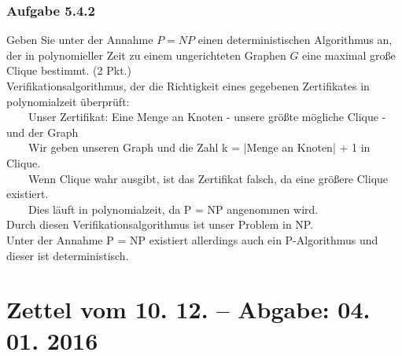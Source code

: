 \documentclass{article}
\begin{document}
\subsubsection*{Aufgabe 5.4.2}
\label{sssec:5.4.2}
Geben Sie unter der Annahme $P = NP$ einen deterministischen Algorithmus an, der in polynomieller
Zeit zu einem ungerichteten Graphen $G$ eine maximal große Clique bestimmt. (2 Pkt.)
\vspace{1cm}\-\\
Verifikationsalgorithmus, der die Richtigkeit eines gegebenen Zertifikates in polynomialzeit überprüft:\\
\-~~~~Unser Zertifikat: Eine Menge an Knoten - unsere größte mögliche Clique - und der Graph\\
\-~~~~Wir geben unseren Graph und die Zahl k = |Menge an Knoten| + 1 in Clique.\\
\-~~~~Wenn Clique wahr ausgibt, ist das Zertifikat falsch, da eine größere Clique existiert.\\
\-~~~~Dies läuft in polynomialzeit, da P = NP angenommen wird.\\
Durch diesen Verifikationsalgorithmus ist unser Problem in NP.\\
Unter der Annahme P = NP existiert allerdings auch ein P-Algorithmus und dieser ist deterministisch.

\newpage
\section*{Zettel vom 10. 12. -- Abgabe: 04. 01. 2016}
\end{document}
